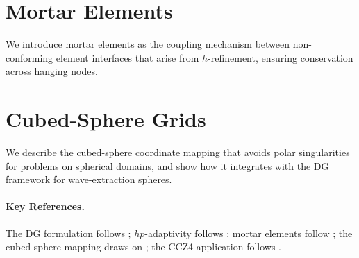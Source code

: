 \section{Mortar Elements}
\label{sec:dg-mortar}

We introduce mortar elements as the coupling mechanism between non-conforming
element interfaces that arise from $h$-refinement, ensuring conservation
across hanging nodes.

\section{Cubed-Sphere Grids\starmark{}}
\label{sec:dg-cubed-sphere}

We describe the cubed-sphere coordinate mapping that avoids polar singularities
for problems on spherical domains, and show how it integrates with the DG
framework for wave-extraction spheres.

\paragraph{Key References.}
The DG formulation follows \cite{HesthavenWarburton2008,Kopriva2009};
$hp$-adaptivity follows \cite{Mavriplis1994}; mortar elements follow
\cite{Kopriva1996}; the cubed-sphere mapping draws on
\cite{Ronchi1996}; the CCZ4 application follows \cite{Dumbser2018}.
